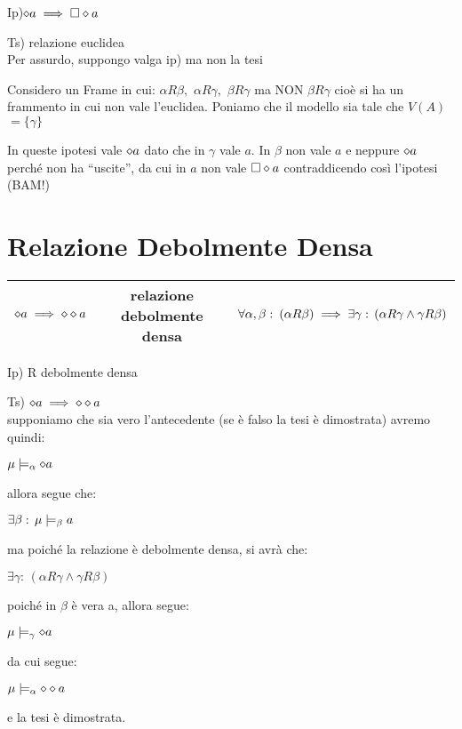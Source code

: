 Ip)$\diamond a\implies\square\diamond a$

Ts) relazione euclidea\\


Per assurdo, suppongo valga ip) ma non la tesi

Considero un Frame in cui: $\alpha R\beta,$ $\alpha R\gamma,$ $\beta R\gamma$
ma NON $\beta R\gamma$ cioè si ha un frammento in cui non vale l'euclidea.
Poniamo che il modello sia tale che $V(A)$$=\{\gamma\}$

In queste ipotesi vale $\diamond a$ dato che in $\gamma$ vale $a$. In
$\beta$ non vale $a$ e neppure $\diamond a$ perché non ha ``uscite'',
da cui in $a$ non vale $\square\diamond a$ contraddicendo così l'ipotesi
(BAM!) 


\section{Relazione Debolmente Densa}

\begin{tabular}{|c|c|c|}
\hline 
$\diamond a\implies\diamond\diamond a$  & relazione debolmente densa  & $\forall\alpha,\beta:\:(\alpha R\beta)\implies\exists\gamma:\,(\alpha R\gamma\wedge\gamma R\beta)$\tabularnewline
\hline 
\end{tabular}

Ip) R debolmente densa

Ts) $\diamond a\implies\diamond\diamond a$ \\


supponiamo che sia vero l'antecedente (se è falso la tesi è dimostrata)
avremo quindi:

$\mu\models_{\alpha}\diamond a$

allora segue che:

$\exists\beta:\,\mu\models_{\beta}a$

ma poiché la relazione è debolmente densa, si avrà che:

$\exists\gamma:\,(\alpha R\gamma\wedge\gamma R\beta)$

poiché in $\beta$ è vera a, allora segue:

$\mu\models_{\gamma}\diamond a$

da cui segue:

$\mu\models_{\alpha}\diamond\diamond a$

e la tesi è dimostrata.

